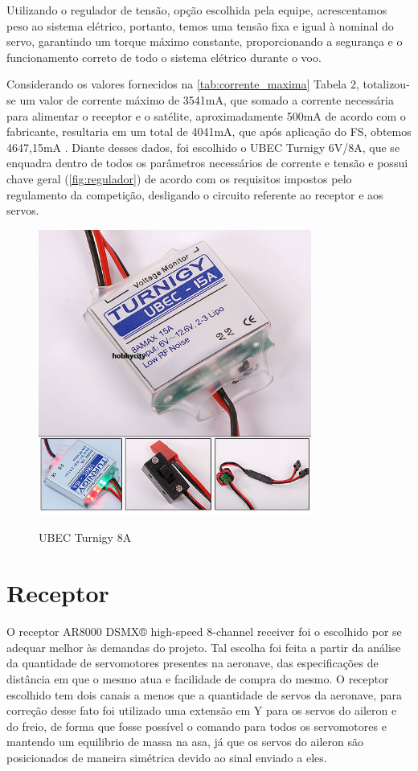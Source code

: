 Utilizando o regulador de tensão, opção escolhida pela equipe, acrescentamos peso ao
sistema elétrico, portanto, temos uma tensão fixa e igual à nominal do servo, garantindo um
torque máximo constante, proporcionando a segurança e o funcionamento correto de todo o
sistema elétrico durante o voo.

Considerando os valores fornecidos na \autoref{tab:corrente_maxima} Tabela 2, totalizou-se um valor de corrente máximo de 3541mA, que somado a corrente necessária para alimentar o receptor e o satélite, aproximadamente 500mA de acordo com o fabricante, resultaria em um total de 4041mA, que
após aplicação do FS, obtemos 4647,15mA . Diante desses dados, foi escolhido o UBEC
Turnigy 6V/8A, que se enquadra dentro de todos os parâmetros necessários de corrente e tensão
e possui chave geral (\autoref{fig:regulador}) de acordo com os requisitos impostos pelo regulamento da
competição, desligando o circuito referente ao receptor e aos servos.

\begin{figure}[H]
    \centering
    \caption{UBEC Turnigy 8A}
    \includegraphics[width=0.8\textwidth]{./Imagens/regulador}
    \label{fig:regulador}
\end{figure}

\section{Receptor}

O receptor AR8000 DSMX® high-speed 8-channel receiver foi o escolhido por se
adequar melhor às demandas do projeto. Tal escolha foi feita a partir da análise da quantidade
de servomotores presentes na aeronave, das especificações de distância em que o mesmo atua
e facilidade de compra do mesmo. O receptor escolhido tem dois canais a menos que a
quantidade de servos da aeronave, para correção desse fato foi utilizado uma extensão em Y
para os servos do aileron e do freio, de forma que fosse possível o comando para todos os
servomotores e mantendo um equilibrio de massa na asa, já que os servos do aileron são
posicionados de maneira simétrica devido ao sinal enviado a eles.

